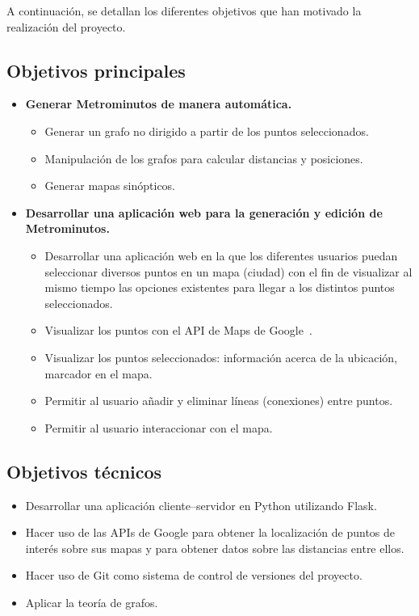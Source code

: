 
A continuación, se detallan los diferentes objetivos que han motivado la realización del proyecto.

\subsection{Objetivos principales}

\begin{itemize}
	\item \textbf{Generar Metrominutos de manera automática.}
	\begin{itemize}
		\item Generar un grafo no dirigido a partir de los puntos seleccionados.
		\item Manipulación de los grafos para calcular distancias y posiciones.
		\item Generar mapas sinópticos.
	\end{itemize}

	\item \textbf{Desarrollar una aplicación web para la generación y edición de Metrominutos.}
	\begin{itemize}
		\item Desarrollar una aplicación web en la que los diferentes usuarios puedan seleccionar diversos puntos en un mapa (ciudad) con el fin de visualizar al mismo tiempo las opciones existentes para llegar a los distintos puntos seleccionados.
		\item Visualizar los puntos con el API de Maps de Google~\cite{doc:google-api-js}.
		\item Visualizar los puntos seleccionados: información acerca de la ubicación, marcador en el mapa.
		\item Permitir al usuario añadir y eliminar líneas (conexiones) entre puntos.
		\item Permitir al usuario interaccionar con el mapa.
	\end{itemize}
\end{itemize}



\subsection{Objetivos técnicos}

\begin{itemize}
	\item Desarrollar una aplicación cliente--servidor en Python utilizando Flask.
	\item Hacer uso de las APIs de Google para obtener la localización de puntos de interés sobre sus mapas y para obtener datos sobre las distancias entre ellos.
	\item Hacer uso de Git como sistema de control de versiones del proyecto.
	\item Aplicar la teoría de grafos.
\end{itemize}
